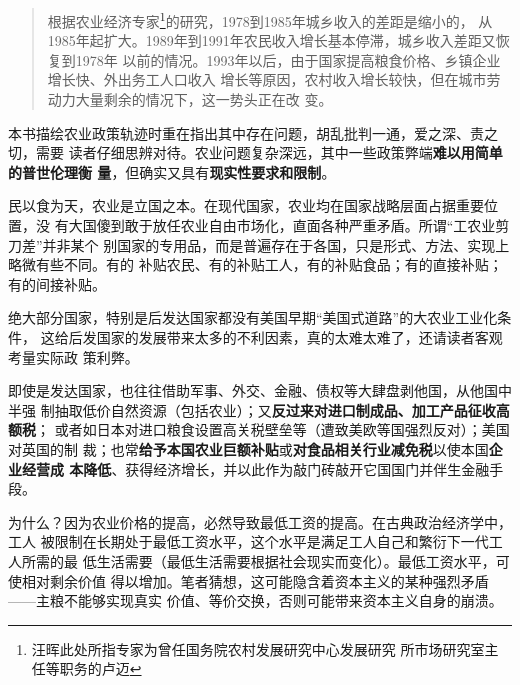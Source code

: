 
\begin{quotation}
  根据农业经济专家\footnote{汪晖此处所指专家为曾任国务院农村发展研究中心发展研究
    所市场研究室主任等职务的卢迈}的研究，1978到1985年城乡收入的差距是缩小的，
  从1985年起扩大。1989年到1991年农民收入增长基本停滞，城乡收入差距又恢复到1978年
  以前的情况。1993年以后，由于国家提高粮食价格、乡镇企业增长快、外出务工人口收入
  增长等原因，农村收入增长较快，但在城市劳动力大量剩余的情况下，这一势头正在改
  变。\cite{wangxiandai}

\end{quotation}


本书描绘农业政策轨迹时重在指出其中存在问题，胡乱批判一通，爱之深、责之切，需要
读者仔细思辨对待。农业问题复杂深远，其中一些政策弊端\textbf{难以用简单的普世伦理衡
  量}，但确实又具有\textbf{现实性要求和限制}。

民以食为天，农业是立国之本。在现代国家，农业均在国家战略层面占据重要位置，没
有大国傻到敢于放任农业自由市场化，直面各种严重矛盾。所谓“工农业剪刀差”并非某个
别国家的专用品，而是普遍存在于各国，只是形式、方法、实现上略微有些不同。有的
补贴农民、有的补贴工人，有的补贴食品；有的直接补贴；有的间接补贴。

绝大部分国家，特别是后发达国家都没有美国早期“美国式道路”的大农业工业化条件，
这给后发国家的发展带来太多的不利因素，真的太难太难了，还请读者客观考量实际政
策利弊。

即使是发达国家，也往往借助军事、外交、金融、债权等大肆盘剥他国，从他国中半强
制抽取低价自然资源（包括农业）；又\textbf{反过来对进口制成品、加工产品征收高额税}；
或者如日本对进口粮食设置高关税壁垒等（遭致美欧等国强烈反对）；美国对英国的制
裁；也常\textbf{给予本国农业巨额补贴}或\textbf{对食品相关行业减免税}以使本国\textbf{企业经营成
  本降低}、获得经济增长，并以此作为敲门砖敲开它国国门并伴生金融手段。

为什么？因为农业价格的提高，必然导致最低工资的提高。在古典政治经济学中，工人
被限制在长期处于最低工资水平，这个水平是满足工人自己和繁衍下一代工人所需的最
低生活需要（最低生活需要根据社会现实而变化）。最低工资水平，可使相对剩余价值
得以增加。笔者猜想，这可能隐含着资本主义的某种强烈矛盾——主粮不能够实现真实
价值、等价交换，否则可能带来资本主义自身的崩溃。

